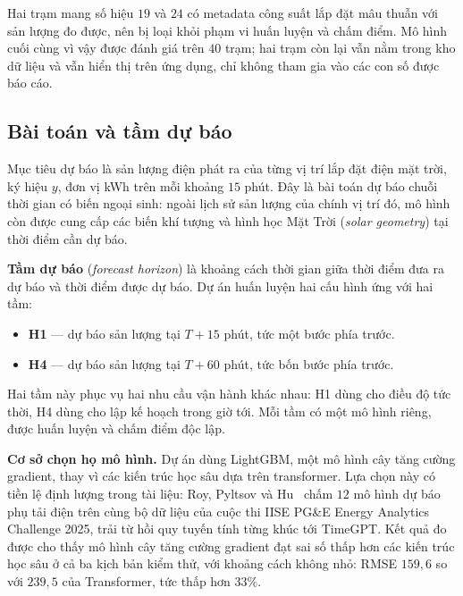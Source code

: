 Hai trạm mang số hiệu $19$ và $24$ có metadata công suất lắp đặt mâu thuẫn với
sản lượng đo được, nên bị loại khỏi phạm vi huấn luyện và chấm điểm. Mô hình cuối cùng
vì vậy được đánh giá trên $40$ trạm; hai trạm còn lại vẫn nằm trong kho dữ liệu và vẫn
hiển thị trên ứng dụng, chỉ không tham gia vào các con số được báo cáo.

\FloatBarrier
\subsection{Bài toán và tầm dự báo}

Mục tiêu dự báo là sản lượng điện phát ra của từng vị trí lắp đặt điện mặt trời, ký hiệu
$y$, đơn vị kWh trên mỗi khoảng $15$ phút. Đây là bài toán dự báo chuỗi thời gian có
biến ngoại sinh: ngoài lịch sử sản lượng của chính vị trí đó, mô hình còn được cung cấp
các biến khí tượng và hình học Mặt Trời (\textit{solar geometry}) tại thời điểm cần dự báo.

\textbf{Tầm dự báo} (\textit{forecast horizon}) là khoảng cách thời gian giữa thời
điểm đưa ra dự báo và thời điểm được dự báo. Dự án huấn luyện hai cấu hình ứng với hai
tầm:

\begin{itemize}
    \item \textbf{H1} --- dự báo sản lượng tại $T + 15$ phút, tức một bước phía trước.
    \item \textbf{H4} --- dự báo sản lượng tại $T + 60$ phút, tức bốn bước phía trước.
\end{itemize}

Hai tầm này phục vụ hai nhu cầu vận hành khác nhau: H1 dùng cho điều độ tức thời, H4
dùng cho lập kế hoạch trong giờ tới. Mỗi tầm có một mô hình riêng, được huấn luyện và
chấm điểm độc lập.

\textbf{Cơ sở chọn họ mô hình.} Dự án dùng LightGBM, một mô hình cây tăng cường
gradient, thay vì các kiến trúc học sâu dựa trên transformer. Lựa chọn này có tiền
lệ định lượng trong tài liệu: Roy, Pyltsov và Hu~\cite{roy2025hourly} chấm $12$ mô hình
dự báo phụ tải điện trên cùng bộ dữ liệu của cuộc thi IISE PG\&E Energy Analytics
Challenge 2025, trải từ hồi quy tuyến tính từng khúc tới TimeGPT. Kết quả đo được cho
thấy mô hình cây tăng cường gradient đạt sai số thấp hơn các kiến trúc học sâu ở cả ba
kịch bản kiểm thử, với khoảng cách không nhỏ: RMSE $159{,}6$ so với $239{,}5$ của
Transformer, tức thấp hơn $33\%$.

